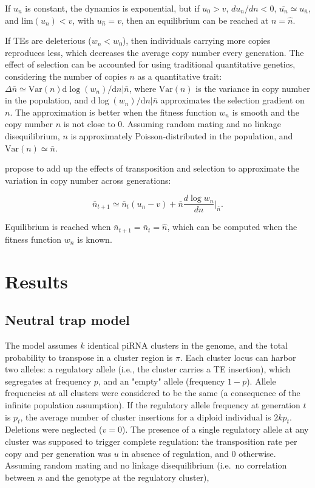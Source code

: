 \documentclass[10pt,a4paper]{article}
\begin{document}
If $u_n$ is constant, the dynamics is exponential, but if $u_0 > v$, $d u_n / d n < 0$, $\overline{u_n} \simeq u_{\bar n}$, and $\mathrm{lim} (u_n) < v$, with $u_{\hat n} = v$, then an equilibrium can be reached at $n = \hat n$. 

If TEs are deleterious ($w_n < w_0$), then individuals carrying more copies reproduces less, which decreases the average copy number every generation. The effect of selection can be accounted for using traditional quantitative genetics, considering the number of copies $n$ as a quantitative trait: $\Delta \bar n \simeq \mathrm{Var}(n) \mathrm d \log(w_n)/ \mathrm d n | \bar n$, where $\mathrm{Var}(n)$ is the variance in copy number in the population, and $\mathrm d \log(w_n)/ \mathrm d n | \bar n$  approximates the selection gradient on $n$. The approximation is better when the fitness function $w_n$ is smooth and the copy number $n$ is not close to 0. Assuming random mating and no linkage disequilibrium, $n$ is approximately Poisson-distributed in the population, and $\mathrm{Var}(n) \simeq \bar n$. 

\cite{CC83} propose to add up the effects of transposition and selection to approximate the variation in copy number across generations:

\begin{equation}\label{eq:cc2}
\bar n_{t+1} \simeq \bar n_t(u_n - v) + \bar n \frac{d \log w_n}{d n} \Bigr|_{\bar n}.
\end{equation}

Equilibrium is reached when $\bar n_{t+1} = \bar n_t = \hat n$, which can be computed when the fitness function $w_n$ is known. 


\section{Results}

\subsection{Neutral trap model} 

The model assumes $k$ identical piRNA clusters in the genome, and the total probability to transpose in a cluster region is $\pi$. Each cluster locus can harbor two alleles: a regulatory allele (i.e., the cluster carries a TE insertion), which segregates at frequency $p$, and an "empty" allele (frequency $1-p$). Allele frequencies at all clusters were considered to be the same (a consequence of the infinite population assumption). If the regulatory allele frequency at generation $t$ is $p_t$, the average number of cluster insertions for a diploid individual is $2kp_t$. Deletions were neglected ($v=0$). The presence of a single regulatory allele at any cluster was supposed to trigger complete regulation: the transposition rate per copy and per generation was $u$ in absence of regulation, and $0$ otherwise. Assuming random mating and no linkage disequilibrium (i.e.\ no correlation between $n$ and the genotype at the regulatory cluster),
\end{document}

